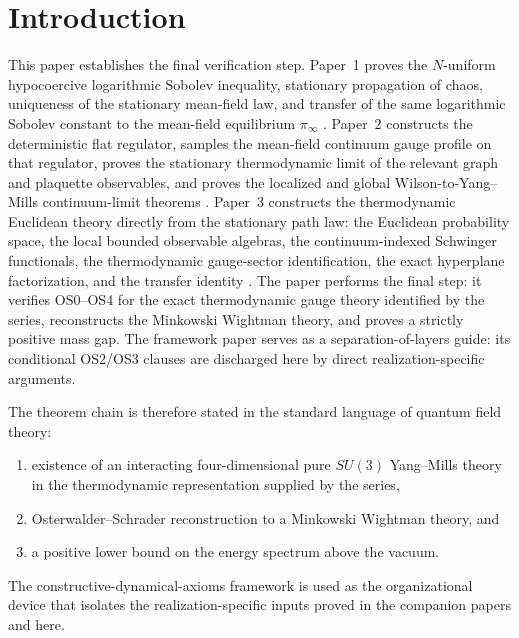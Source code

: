 \documentclass[11pt]{article}
\theoremstyle{definition}
\theoremstyle{remark}
\begin{document}
\tableofcontents

\section{Introduction}

This paper establishes the final verification step.
Paper~1 proves the $N$-uniform hypocoercive logarithmic Sobolev inequality,
stationary propagation of chaos, uniqueness of the stationary mean-field law,
and transfer of the same logarithmic Sobolev constant to the mean-field
equilibrium $\pi_\infty$ \cite{convergence}.
Paper~2 constructs the deterministic flat regulator, samples the mean-field
continuum gauge profile on that regulator, proves the stationary thermodynamic
limit of the relevant graph and plaquette observables, and proves the localized
and global Wilson-to-Yang--Mills continuum-limit theorems \cite{lattice}.
Paper~3 constructs the thermodynamic Euclidean theory directly from the
stationary path law: the Euclidean probability space, the local bounded
observable algebras, the continuum-indexed Schwinger functionals, the
thermodynamic gauge-sector identification, the exact hyperplane factorization,
and the transfer identity \cite{quantization}.
The paper performs the final step: it verifies OS0--OS4 for the exact
thermodynamic gauge theory identified by the series, reconstructs the Minkowski
Wightman theory, and proves a strictly positive mass gap.  The framework paper
\cite{axioms} serves as a separation-of-layers guide:
its conditional OS2/OS3 clauses are discharged here by direct
realization-specific arguments.

The theorem chain is therefore stated in the
standard language of quantum field theory:
\begin{enumerate}[leftmargin=1.5em]
\item existence of an interacting four-dimensional pure $SU(3)$ Yang--Mills
theory in the thermodynamic representation supplied by the series,
\item Osterwalder--Schrader reconstruction to a Minkowski Wightman theory, and
\item a positive lower bound on the energy spectrum above the vacuum.
\end{enumerate}
The constructive-dynamical-axioms framework is used as the organizational
device that isolates the realization-specific inputs proved in the companion
papers and here.
\end{document}
